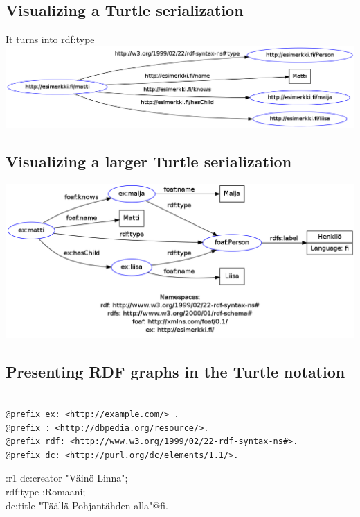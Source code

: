 \documentclass{article}
\begin{document}
$ $

$ $

$ $

$ $

$ $

$ $

$ $

$ $

$ $

$ $

\subsection{Visualizing a Turtle serialization }

It turns into rdf:type \\

\includegraphics[width=\textwidth]{rdf-grapher.png}

\subsection{Visualizing a larger Turtle serialization}

\includegraphics[width=\textwidth]{rdf-grapher2.png}

\subsection{Presenting RDF graphs in the Turtle notation}

\begin{verbatim}

@prefix ex: <http://example.com/> .
@prefix : <http://dbpedia.org/resource/>.
@prefix rdf: <http://www.w3.org/1999/02/22-rdf-syntax-ns#>.
@prefix dc: <http://purl.org/dc/elements/1.1/>.
\end{verbatim}
:r1 dc:creator "V{\"a}inö Linna"; \\
rdf:type :Romaani; \\
dc:title "T{\"a}{\"a}ll{\"a} Pohjantähden alla"@fi. \\
\end{document}
